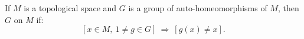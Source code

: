 If $M$ is a topological space and $G$ is a group of auto-homeomorphisms of $M$, then $G$  on $M$ if:
$$[x \in M,\ 1 \neq g \in G] \ \Rightarrow\ [g(x) \neq x].$$

